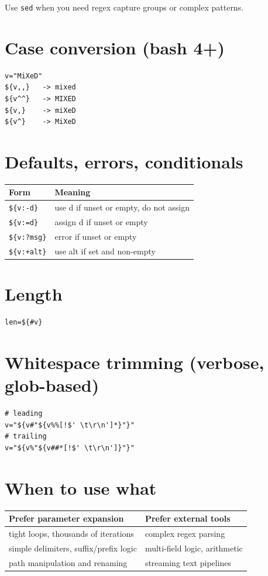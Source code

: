 \documentclass[11pt]{article}
\begin{document}
Use \texttt{sed} when you need regex capture groups or complex patterns.

\section{Case conversion (bash 4+)}
\begin{lstlisting}
v="MiXeD"
${v,,}   -> mixed
${v^^}   -> MIXED
${v,}    -> miXeD
${v^}    -> MiXeD
\end{lstlisting}

\section{Defaults, errors, conditionals}
\begin{longtable}{ll}
\toprule
Form & Meaning \\
\midrule
\texttt{\$\{v:-d\}}   & use d if unset or empty, do not assign \\
\texttt{\$\{v:=d\}}   & assign d if unset or empty \\
\texttt{\$\{v:?msg\}} & error if unset or empty \\
\texttt{\$\{v:+alt\}} & use alt if set and non-empty \\
\bottomrule
\end{longtable}

\section{Length}
\begin{lstlisting}
len=${#v}
\end{lstlisting}

\section{Whitespace trimming (verbose, glob-based)}
\begin{lstlisting}
# leading
v="${v#"${v%%[!$' \t\r\n']*}"}"
# trailing
v="${v%"${v##*[!$' \t\r\n']}"}"
\end{lstlisting}

\section{When to use what}
\begin{longtable}{p{}p{}}
\toprule
Prefer parameter expansion & Prefer external tools \\
\midrule
tight loops, thousands of iterations & complex regex parsing \\
simple delimiters, suffix/prefix logic & multi-field logic, arithmetic \\
path manipulation and renaming & streaming text pipelines \\
\bottomrule
\end{longtable}
\end{document}
